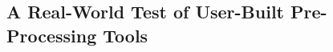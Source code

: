 \begin{refsection}

    \subsection{A Real-World Test of User-Built Pre-Processing Tools}


\end{refsection}
